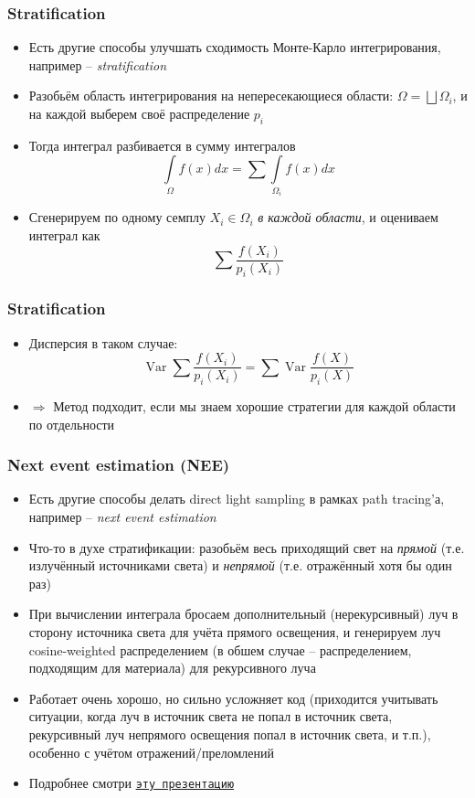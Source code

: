 \documentclass[10pt]{beamer}
\begin{document}
\begin{frame}
\frametitle{Stratification}
\begin{itemize}
\item Есть другие способы улучшать сходимость Монте-Карло интегрирования, например -- \textit{stratification}
\pause
\item Разобьём область интегрирования на непересекающиеся области: \(\Omega = \bigsqcup \Omega_i\), и на каждой выберем своё распределение \(p_i\)
\pause
\item Тогда интеграл разбивается в сумму интегралов
\begin{equation*}
\int\limits_\Omega f(x)dx = \sum \int\limits_{\Omega_i} f(x)dx
\end{equation*}
\pause
\item Сгенерируем по одному семплу \(X_i\in\Omega_i\) \textit{в каждой области}, и оцениваем интеграл как
\begin{equation*}
\sum \frac{f(X_i)}{p_i(X_i)}
\end{equation*}
\end{itemize}
\end{frame}

\begin{frame}
\frametitle{Stratification}
\begin{itemize}
\item Дисперсия в таком случае:
\begin{equation*}
\operatorname{Var}\sum \frac{f(X_i)}{p_i(X_i)} = \sum \operatorname{Var}\frac{f(X)}{p_i(X)}
\end{equation*}
\pause
\item \(\Longrightarrow\) Метод подходит, если мы знаем хорошие стратегии для каждой области по отдельности
\end{itemize}
\end{frame}

\begin{frame}
\frametitle{Next event estimation (NEE)}
\begin{itemize}
\item Есть другие способы делать direct light sampling в рамках path tracing'а, например -- \textit{next event estimation}
\pause
\item Что-то в духе стратификации: разобьём весь приходящий свет на \textit{прямой} (т.е. излучённый источниками света) и \textit{непрямой} (т.е. отражённый хотя бы один раз)
\pause
\item При вычислении интеграла бросаем дополнительный (нерекурсивный) луч в сторону источника света для учёта прямого освещения, и генерируем луч cosine-weighted распределением (в обшем случае -- распределением, подходящим для материала) для рекурсивного луча
\pause
\item Работает очень хорошо, но сильно усложняет код (приходится учитывать ситуации, когда луч в источник света не попал в источник света, рекурсивный луч непрямого освещения попал в источник света, и т.п.), особенно с учётом отражений/преломлений
\pause
\item Подробнее смотри \href{https://www.cg.tuwien.ac.at/sites/default/files/course/4411/attachments/08_next\%20event\%20estimation.pdf}{\texttt{эту презентацию}}
\end{itemize}
\end{frame}
\end{document}
